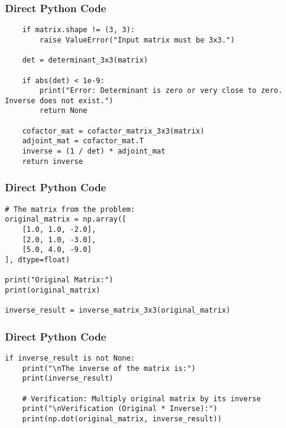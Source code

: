 \documentclass{beamer}
\begin{document}
\begin{frame}[fragile]
\frametitle{Direct Python Code}
\begin{lstlisting}
    if matrix.shape != (3, 3):
        raise ValueError("Input matrix must be 3x3.")
        
    det = determinant_3x3(matrix)

    if abs(det) < 1e-9:
        print("Error: Determinant is zero or very close to zero. Inverse does not exist.")
        return None

    cofactor_mat = cofactor_matrix_3x3(matrix)
    adjoint_mat = cofactor_mat.T
    inverse = (1 / det) * adjoint_mat
    return inverse
\end{lstlisting}
\end{frame}

\begin{frame}[fragile]
\frametitle{Direct Python Code}
\begin{lstlisting}
# The matrix from the problem:
original_matrix = np.array([
    [1.0, 1.0, -2.0],
    [2.0, 1.0, -3.0],
    [5.0, 4.0, -9.0]
], dtype=float)

print("Original Matrix:")
print(original_matrix)

inverse_result = inverse_matrix_3x3(original_matrix)
\end{lstlisting}
\end{frame}

\begin{frame}[fragile]
\frametitle{Direct Python Code}
\begin{lstlisting}
if inverse_result is not None:
    print("\nThe inverse of the matrix is:")
    print(inverse_result)

    # Verification: Multiply original matrix by its inverse
    print("\nVerification (Original * Inverse):")
    print(np.dot(original_matrix, inverse_result))
\end{lstlisting}
\end{frame}
\end{document}
